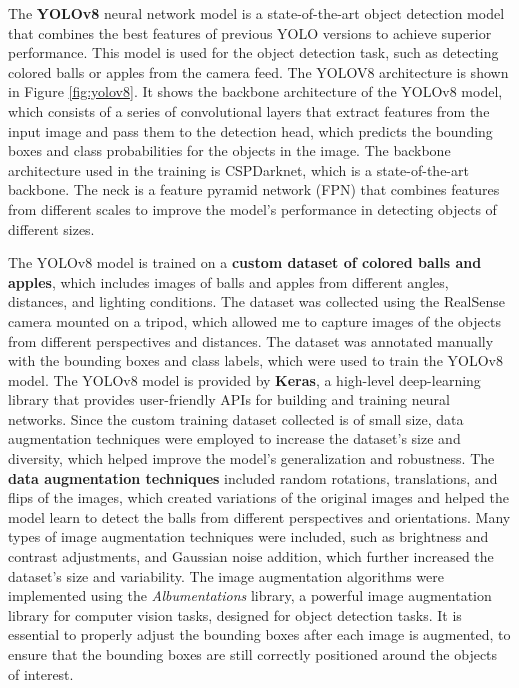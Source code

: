 The \textbf{YOLOv8} neural network model is a state-of-the-art object detection model \cite{reis2023realtimeyolov8}
that combines the best features of previous YOLO versions to achieve superior performance. 
This model is used for the object detection task, such as detecting colored balls or apples
from the camera feed. The YOLOV8 architecture is shown in Figure \ref{fig:yolov8}. It shows the backbone architecture
of the YOLOv8 model, which consists of a series of convolutional layers that extract features from the input image
and pass them to the detection head, which predicts the bounding boxes and class probabilities for the objects in the image.
The backbone architecture used in the training is CSPDarknet, which is a state-of-the-art backbone.
The neck is a feature pyramid network (FPN) that combines features from different scales to improve the model's
performance in detecting objects of different sizes.

The YOLOv8 model is trained on a \textbf{custom dataset of colored balls and apples}, which includes images of balls and apples
from different angles, distances, and lighting conditions. The dataset was collected using the RealSense camera mounted
on a tripod, which allowed me to capture images of the objects from different perspectives and distances. The dataset
was annotated manually with the bounding boxes and class labels, which were used to train the YOLOv8 model.
The YOLOv8 model is provided by \textbf{Keras}, a high-level deep-learning library that provides user-friendly
APIs for building and training neural networks. Since the custom training dataset collected is of small size,
data augmentation techniques were employed to increase the dataset's size and diversity, which helped improve the model's
generalization and robustness. The \textbf{data augmentation techniques} included random rotations, translations, and flips
of the images, which created variations of the original images and helped the model learn to detect the balls
from different perspectives and orientations. Many types of image augmentation techniques were included, such as
brightness and contrast adjustments, and Gaussian noise addition, which further increased the dataset's
size and variability. The image augmentation algorithms were implemented using the \textit{Albumentations} library,
a powerful image augmentation library for computer vision tasks, designed for 
object detection tasks. It is essential to properly adjust the bounding boxes after each image
is augmented, to ensure that the bounding boxes are still correctly positioned around the objects of interest.

